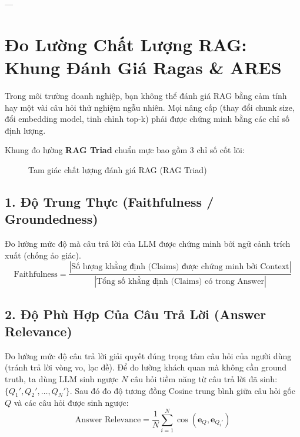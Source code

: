 ---

\section{Đo Lường Chất Lượng RAG: Khung Đánh Giá Ragas \& ARES}
\label{sec:ragas-evaluation}

Trong môi trường doanh nghiệp, bạn không thể đánh giá RAG bằng cảm tính hay một vài câu hỏi thử nghiệm ngẫu nhiên. Mọi nâng cấp (thay đổi chunk size, đổi embedding model, tinh chỉnh top-k) phải được chứng minh bằng các chỉ số định lượng.

Khung đo lường \textbf{RAG Triad} chuẩn mực bao gồm 3 chỉ số cốt lõi:

\begin{figure}[htbp]
\centering
{}
\caption{Tam giác chất lượng đánh giá RAG (RAG Triad)}
\label{fig:rag-triad}
\end{figure}

\subsection{1. Độ Trung Thực (Faithfulness / Groundedness)}
Đo lường mức độ mà câu trả lời của LLM được chứng minh bởi ngữ cảnh trích xuất (chống ảo giác).
\begin{equation}
\text{Faithfulness} = \frac{|\text{Số lượng khẳng định (Claims) được chứng minh bởi Context}|}{|\text{Tổng số khẳng định (Claims) có trong Answer}|}
\end{equation}

\subsection{2. Độ Phù Hợp Của Câu Trả Lời (Answer Relevance)}
Đo lường mức độ câu trả lời giải quyết đúng trọng tâm câu hỏi của người dùng (tránh trả lời vòng vo, lạc đề).
Để đo lường khách quan mà không cần ground truth, ta dùng LLM sinh ngược $N$ câu hỏi tiềm năng từ câu trả lời đã sinh: $\{Q_1', Q_2', \dots, Q_N'\}$. Sau đó đo độ tương đồng Cosine trung bình giữa câu hỏi gốc $Q$ và các câu hỏi được sinh ngược:
\begin{equation}
\text{Answer Relevance} = \frac{1}{N} \sum_{i=1}^N \cos(\mathbf{e}_Q, \mathbf{e}_{Q_i'})
\end{equation}


